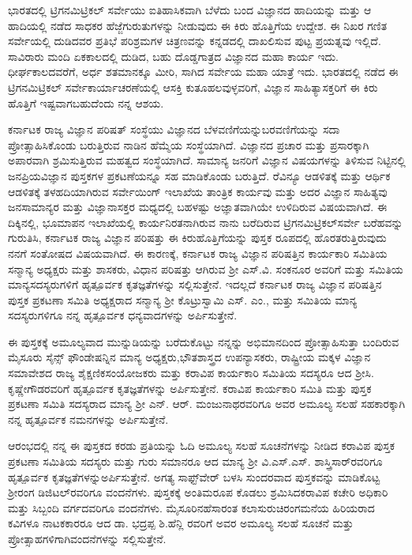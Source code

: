 ಭಾರತದಲ್ಲಿ ಟ್ರಿಗನಮಿಟ್ರಿಕಲ್​ ಸರ್ವೇಯು ಐತಿಹಾಸಿಕವಾಗಿ ಬೆಳೆದು ಬಂದ ವಿಜ್ಞಾನದ ಹಾದಿಯನ್ನು ಮತ್ತು ಆ ಹಾದಿಯಲ್ಲಿ ನಡೆದ ಸಾಧಕರ ಹೆಜ್ಜೆಗುರುತುಗಳನ್ನು ನೀಡುವುದು ಈ ಕಿರು ಹೊತ್ತಿಗೆಯ ಉದ್ದೇಶ. ಈ ನಿಖರ ಗಣಿತ ಸರ್ವೇಯಲ್ಲಿ ದುಡಿದವರ ಪ್ರತಿಭೆ ಪರಿಶ್ರಮಗಳ ಚಿತ್ರಣವನ್ನು ಕನ್ನಡದಲ್ಲಿ ದಾಖಲಿಸುವ ಪುಟ್ಟ ಪ್ರಯತ್ನವು ಇಲ್ಲಿದೆ. ಸಾವಿರಾರು ಮಂದಿ ಏಕಕಾಲದಲ್ಲಿ ದುಡಿದ, ಬಹು ದೊಡ್ಡಗಾತ್ರದ ವಿಜ್ಞಾನದ ಮಹಾ ಕಾರ್ಯ ಇದು. ಧೀರ್ಘ\-ಕಾಲದವರೆಗೆ, ಅರ್ಧ ಶತಮಾನಕ್ಕೂ ಮೀರಿ, ಸಾಗಿದ ಸರ್ವೇಯ ಮಹಾ ಯಾತ್ರೆ ಇದು. ಭಾರತದಲ್ಲಿ ನಡೆದ ಈ ಟ್ರಿಗನಮಿಟ್ರಿಕಲ್​ ಸರ್ವೇಕಾರ್ಯಾಚರಣೆಯಲ್ಲಿ ಆಸಕ್ತಿ ಕುತೂಹಲವುಳ್ಳವರಿಗೆ, ವಿಜ್ಞಾನ ಸಾಹಿತ್ಯಾಸಕ್ತರಿಗೆ ಈ ಕಿರು ಹೊತ್ತಿಗೆ ಇಷ್ಟವಾಗಬಹುದೆಂದು ನನ್ನ ಆಶಯ. 

ಕರ್ನಾಟಕ ರಾಜ್ಯ ವಿಜ್ಞಾನ ಪರಿಷತ್​ ಸಂಸ್ಥೆಯು ವಿಜ್ಞಾನದ ಬೆಳವಣಿಗೆಯನ್ನು\break ಬರವಣಿಗೆಯನ್ನು ಸದಾ ಪ್ರೋತ್ಸಾಹಿಸಿಕೊಂಡು ಬರುತ್ತಿರುವ ನಾಡಿನ ಹೆಮ್ಮೆಯ ಸಂಸ್ಥೆಯಾಗಿದೆ. ವಿಜ್ಞಾನದ ಪ್ರಚಾರ ಮತ್ತು ಪ್ರಸಾರಕ್ಕಾಗಿ ಅಪಾರವಾಗಿ ಶ್ರಮಿಸುತ್ತಿರುವ ಮಹತ್ವದ ಸಂಸ್ಥೆಯಾಗಿದೆ. ಸಾಮಾನ್ಯ ಜನರಿಗೆ ವಿಜ್ಞಾನ ವಿಷಯಗಳನ್ನು ತಿಳಿಸುವ ನಿಟ್ಟಿನಲ್ಲಿ ಜನಪ್ರಿಯ\break ವಿಜ್ಞಾನ ಪುಸ್ತಕಗಳ ಪ್ರಕಟಣೆಯನ್ನೂ ಸಹ ಮಾಡಿಕೊಂಡು ಬರುತ್ತಿದೆ. ರೆವಿನ್ಯೂ ಆಡಳಿತಕ್ಕೆ ಮತ್ತು ಆರ್ಥಿಕ ಆಡಳಿತಕ್ಕೆ ತಳಹದಿಯಾಗಿರುವ ಸರ್ವೇಯಿಂಗ್​ ಇಲಾಖೆಯ ತಾಂತ್ರಿಕ ಕಾರ್ಯವು ಮತ್ತು ಅದರ ವಿಜ್ಞಾನ ಸಾಹಿತ್ಯವು ಜನಸಾಮಾನ್ಯರ ಮತ್ತು ವಿಜ್ಞಾನಾಸಕ್ತರ ಮಧ್ಯದಲ್ಲಿ ಬಹಳಷ್ಟು ಅಜ್ಞಾತವಾಗಿಯೇ ಉಳಿದಿರುವ ವಿಷಯವಾಗಿದೆ. ಈ ದಿಕ್ಕಿನಲ್ಲಿ, ಭೂಮಾಪನ ಇಲಾಖೆಯಲ್ಲಿ ಕಾರ್ಯನಿರತನಾಗಿರುವ ನಾನು ಬರೆದಿರುವ ಟ್ರಿಗನಮಿಟ್ರಿಕಲ್​ ಸರ್ವೇ ಬರೆಹವನ್ನು ಗುರುತಿಸಿ, ಕರ್ನಾಟಕ ರಾಜ್ಯ ವಿಜ್ಞಾನ ಪರಿಷತ್ತು ಈ ಕಿರುಹೊತ್ತಿಗೆಯನ್ನು ಪುಸ್ತಕ ರೂಪದಲ್ಲಿ ಹೊರತರುತ್ತಿರುವುದು ನನಗೆ ಸಂತೋಷದ ವಿಷಯವಾಗಿದೆ. ಈ ಕಾರಣಕ್ಕೆ, ಕರ್ನಾಟಕ ರಾಜ್ಯ ವಿಜ್ಞಾನ ಪರಿಷತ್ತಿನ ಕಾರ್ಯಕಾರಿ ಸಮಿತಿಯ ಸನ್ಮಾನ್ಯ ಅಧ್ಯಕ್ಷರು ಮತ್ತು ಶಾಸಕರು, ವಿಧಾನ ಪರಿಷತ್ತು ಆಗಿರುವ ಶ‍್ರೀ ಎಸ್​.ವಿ. ಸಂಕನೂರ ಅವರಿಗೆ ಮತ್ತು ಸಮಿತಿಯ ಮಾನ್ಯ\break ಸದಸ್ಯರುಗಳಿಗೆ ಹೃತ್ಪೂರ್ವಕ ಕೃತಜ್ಞತೆಗಳನ್ನು ಸಲ್ಲಿಸುತ್ತೇನೆ. ಇದಲ್ಲದೆ ಕರ್ನಾಟಕ ರಾಜ್ಯ ವಿಜ್ಞಾನ ಪರಿಷತ್ತಿನ ಪುಸ್ತಕ ಪ್ರಕಟಣಾ ಸಮಿತಿ ಅಧ್ಯಕ್ಷರಾದ ಸನ್ಮಾನ್ಯ ಶ‍್ರೀ ಕೊಟ್ರುಸ್ವಾಮಿ ಎಸ್​. ಎಂ., ಮತ್ತು ಸಮಿತಿಯ ಮಾನ್ಯ ಸದಸ್ಯರುಗಳಿಗೂ ನನ್ನ ಹೃತ್ಪೂರ್ವಕ ಧನ್ಯವಾದ\-ಗಳನ್ನು ಅರ್ಪಿಸುತ್ತೇನೆ.

ಈ ಪುಸ್ತಕಕ್ಕೆ ಅಮೂಲ್ಯವಾದ ಮುನ್ನುಡಿಯನ್ನು ಬರೆದುಕೊಟ್ಟು ನನ್ನನ್ನು ಅಭಿಮಾನದಿಂದ ಪ್ರೋತ್ಸಾಹಿಸುತ್ತಾ ಬಂದಿರುವ ಮೈಸೂರು ಸೈನ್ಸ್​ ಫೌಂಡೇಷನ್ನಿನ ಮಾನ್ಯ ಅಧ್ಯಕ್ಷರು,\break ಭೌತಶಾಸ್ತ್ರದ ಉಪನ್ಯಾಸಕರು, ರಾಷ್ಟ್ರೀಯ ಮಕ್ಕಳ ವಿಜ್ಞಾನ ಸಮಾವೇಶದ ರಾಜ್ಯ ಶೈಕ್ಷಣಿಕ\break ಸಂಯೋಜಕರು ಮತ್ತು ಕರಾವಿಪ ಕಾರ್ಯಕಾರಿ ಸಮಿತಿಯ ಸದಸ್ಯರೂ ಆದ ಶ‍್ರೀ\break ಸಿ. ಕೃಷ್ಣೇಗೌಡರವರಿಗೆ ಹೃತ್ಪೂರ್ವಕ ಕೃತಜ್ಞತೆಗಳನ್ನು ಅರ್ಪಿಸುತ್ತೇನೆ. ಕರಾವಿಪ ಕಾರ್ಯಕಾರಿ ಸಮಿತಿ ಮತ್ತು ಪುಸ್ತಕ ಪ್ರಕಟಣಾ ಸಮಿತಿ ಸದಸ್ಯರಾದ ಮಾನ್ಯ ಶ‍್ರೀ ಎನ್​. ಆರ್​. ಮಂಜುನಾಥ\-ರವರಿಗೂ ಅವರ ಅಮೂಲ್ಯ ಸಲಹೆ ಸಹಕಾರಕ್ಕಾಗಿ ನನ್ನ ಹೃತ್ಪೂರ್ವಕ ನಮನಗಳನ್ನು ಅರ್ಪಿಸುತ್ತೇನೆ.

ಆರಂಭದಲ್ಲಿ ನನ್ನ ಈ ಪುಸ್ತಕದ ಕರಡು ಪ್ರತಿಯನ್ನು ಓದಿ ಅಮೂಲ್ಯ ಸಲಹೆ ಸೂಚನೆ\-ಗಳನ್ನು ನೀಡಿದ ಕರಾವಿಪ ಪುಸ್ತಕ ಪ್ರಕಟಣಾ ಸಮಿತಿಯ ಸದಸ್ಯರು ಮತ್ತು ಗುರು ಸಮಾನರೂ ಆದ ಮಾನ್ಯ ಶ‍್ರೀ ವಿ.ಎಸ್​.ಎಸ್​. ಶಾಸ್ತ್ರಿಸಾರ್​ರವರಿಗೂ ಹೃತ್ಪೂರ್ವಕ ಕೃತಜ್ಞತೆಗಳನ್ನು\break ಅರ್ಪಿಸುತ್ತೇನೆ. ಅಗತ್ಯ ಸಾಫ್ಟ್​ವೇರ್​ ಬಳಸಿ ಸುಂದರವಾದ ಪುಸ್ತಕವನ್ನು ಮಾಡಿಕೊಟ್ಟ ಶ‍್ರೀರಂಗ ಡಿಜಿಟಲ್​ರವರಿಗೂ ವಂದನೆಗಳು. ಪುಸ್ತಕಕ್ಕೆ ಅಂತಿಮರೂಪ ಕೊಡಲು ಶ್ರಮಿಸಿದ\break ಕರಾವಿಪ ಕಚೇರಿ ಅಧಿಕಾರಿ ಮತ್ತು ಸಿಬ್ಬಂದಿ ವರ್ಗದವರಿಗೂ ವಂದನೆಗಳು. ಮೈಸೂರಿನ\break ಹೆಸಾರಂತ ಕಲಾಸುರುಚಿರಂಗಮನೆಯ ಹಿರಿಯರಾದ ಕವಿಗಳೂ ನಾಟಕಕಾರರೂ ಆದ ಡಾ. ಭದ್ರಪ್ಪ ಶಿ.ಹೆನ್ಲಿ ರವರಿಗೆ ಅವರ ಅಮೂಲ್ಯ ಸಲಹೆ ಸೂಚನೆ ಮತ್ತು ಪ್ರೋತ್ಸಾಹಗಳಿಗಾಗಿ\break ವಂದನೆಗಳನ್ನು ಸಲ್ಲಿಸುತ್ತೇನೆ.

